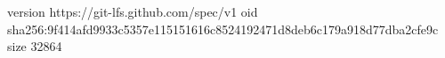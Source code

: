 version https://git-lfs.github.com/spec/v1
oid sha256:9f414afd9933c5357e115151616c8524192471d8deb6c179a918d77dba2cfe9c
size 32864
